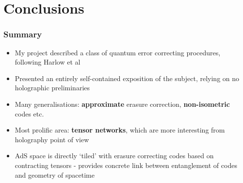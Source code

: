 \documentclass[11pt]{beamer}
\begin{document}
	\section{Conclusions}
	
	\begin{frame}
		\frametitle{Summary}
		\begin{itemize}[<+->]
			\item My project described a class of quantum error correcting procedures, following Harlow et al
			\item Presented an entirely self-contained exposition of the subject, relying on no holographic preliminaries
			\item Many generalisations: \textbf{approximate} erasure correction, \textbf{non-isometric} codes etc.
			\item Most prolific area: \textbf{tensor networks}, which are more interesting from holography point of view
			\item AdS space is directly `tiled' with erasure correcting codes based on contracting tensors - provides concrete link between entanglement of codes and geometry of spacetime
		\end{itemize}
	\end{frame}

	
\end{document}
